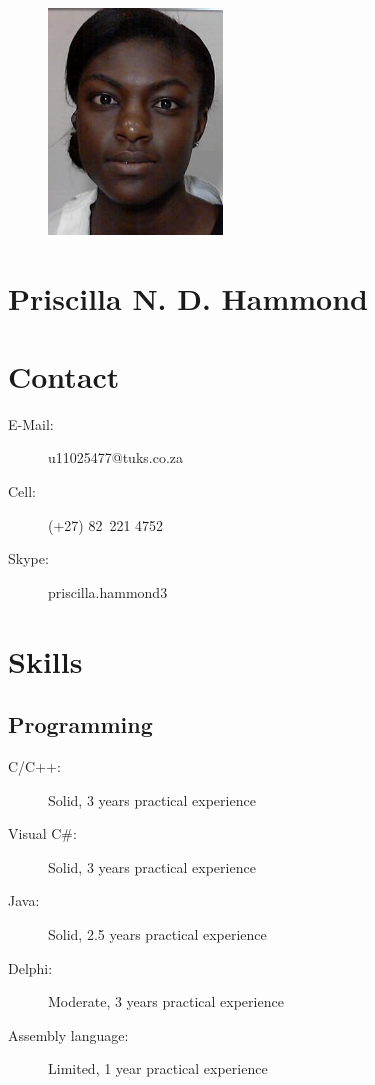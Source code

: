

%

\begin{center}
	\begin{figure}[H]
		\centering
		\includegraphics[height=6cm]{Priscilla}
	\end{figure}
\end{center}

\section*
{
	\Huge{Priscilla N. D. Hammond}
}
\vspace{0.5cm}

\section*{Contact}
	\begin{description}
		\item[E-Mail:] u11025477@tuks.co.za
		\item[Cell:] (+27) 82 221 4752
		\item[Skype:] priscilla.hammond3
	\end{description}

\section*{Skills}

	\subsection*{Programming}
		\begin{description}
			\item [C/C++:] Solid, 3 years practical experience
			\item [Visual C\#:] Solid, 3 years practical experience
			\item [Java:] Solid, 2.5 years practical experience
			\item [Delphi:] Moderate, 3 years practical experience
			\item [Assembly language:] Limited, 1 year practical experience
		\end{description}
